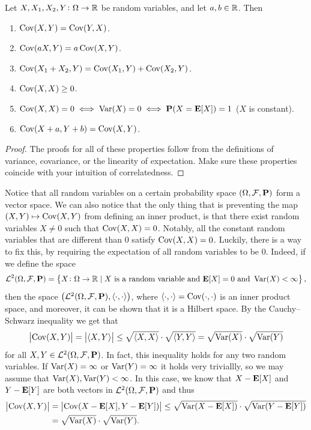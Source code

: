 \documentclass[11pt,a4paper]{article}
\begin{document}
\begin{proposition}
  Let $X,X_1,X_2,Y \colon \Omega \to \mathbb{R}$ be random variables, and 
  let $a, b \in \mathbb{R}$.
  Then
  \begin{enumerate}
    \item[(1)] $\operatorname{Cov}(X,Y) = \operatorname{Cov}(Y,X)$.
    \item[(2)] $\operatorname{Cov}(aX,Y) = a \operatorname{Cov}(X,Y)$.
    \item[(3)] $\operatorname{Cov}(X_1 + X_2,Y) = \operatorname{Cov}(X_1,Y) + \operatorname{Cov}(X_2,Y)$.
    \item[(4)] $\operatorname{Cov}(X,X) \geq 0$.
    \item[(5)] $\operatorname{Cov}(X,X) = 0 \iff \operatorname{Var}(X) = 0 \iff 
            \mathbf{P}(X = \mathbf{E}[X]) = 1$ ($X$ is constant).
    \item[(6)] $\operatorname{Cov}(X + a, Y + b) = \operatorname{Cov}(X,Y)$.
  \end{enumerate}
\end{proposition}
\begin{proof}
  The proofs for all of these properties follow from the definitions
  of variance, covariance, or the linearity of expectation.
  Make sure these properties coincide with your intuition
  of correlatedness.
\end{proof}

\begin{remark}
  \label{rmk:L-two}
Notice that all random variables on a certain probability space
$(\Omega, \mathcal F, \mathbf{P})$ form a vector space. We can also
notice that the only thing that is preventing the map 
$(X,Y) \mapsto \operatorname{Cov}(X,Y)$ from defining an inner product, is that
there exist random variables $X \neq 0$ such that $\operatorname{Cov}(X,X) = 0$.
Notably, all the constant random variables that are different than $0$
satisfy $\operatorname{Cov}(X,X) = 0$.
Luckily, there is a way to fix this, by requiring the expectation of
all random variables to be $0$.
Indeed, if we define the space
\[
  \mathcal L^2(\Omega, \mathcal F, \mathbf{P}) =
  \left\{X \colon \Omega \to \mathbb{R} \mid
  X\text{ is a random variable} \text{ and } \mathbf{E}[X] = 0 \text{ and } \operatorname{Var}(X) < \infty\right\},
\]
then the space
$\left(\mathcal L^2(\Omega, \mathcal F, \mathbf{P}), \left\langle \cdot, \cdot \right\rangle\right)$,
where $\left\langle \cdot, \cdot \right\rangle = \operatorname{Cov}(\cdot,\cdot)$
is an inner product space, and moreover, it can be shown
that it is a Hilbert space.
By the Cauchy--Schwarz inequality we get that
\[
  \left\lvert\operatorname{Cov}(X,Y)\right\rvert =
  \left\lvert\left\langle X, Y \right\rangle\right\rvert \le
  \sqrt{\left\langle X, X \right\rangle} \cdot \sqrt{\left\langle Y, Y \right\rangle} =
  \sqrt{\operatorname{Var}(X)} \cdot \sqrt{\operatorname{Var}(Y)}
\]
for all $X,Y \in \mathcal L^2(\Omega, \mathcal F, \mathbf{P})$.
In fact, this inequality holds for any two random variables.
If $\operatorname{Var}(X) = \infty$ or $\operatorname{Var}(Y) = \infty$ it holds very triviallly,
so we may assume that $\operatorname{Var}(X),\operatorname{Var}(Y) < \infty$.
In this case, we know that $X - \mathbf{E}[X]$ and $Y - \mathbf{E}[Y]$ are both
vectors in $\mathcal L^2(\Omega, \mathcal F, \mathbf{P})$ and thus
\begin{align*}
  \left\lvert\operatorname{Cov}(X,Y)\right\rvert &= \left\lvert\operatorname{Cov}(X - \mathbf{E}[X],{Y - \mathbf{E}[Y]})\right\rvert
  \le \sqrt{\operatorname{Var}(X - \mathbf{E}[X])} \cdot \sqrt{\operatorname{Var}(Y - \mathbf{E}[Y])} \\
  &= \sqrt{\operatorname{Var}(X)} \cdot \sqrt{\operatorname{Var}(Y)}.
\end{align*}
\end{remark}
\end{document}
